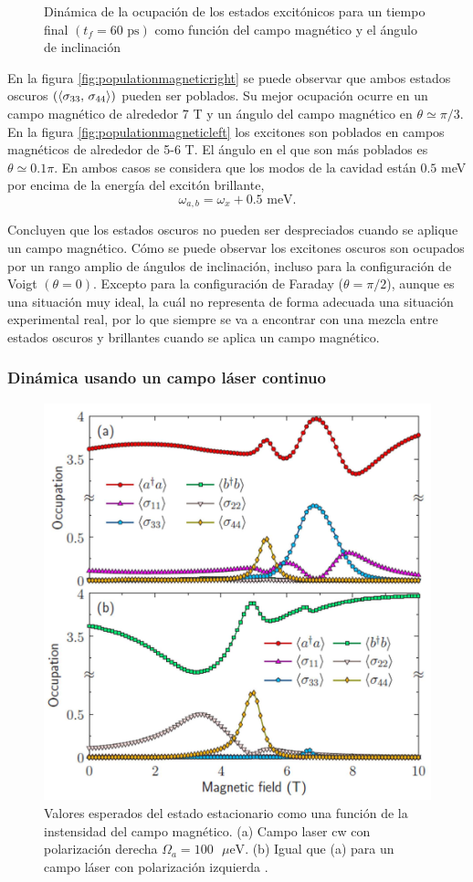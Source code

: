 \documentclass[../main.tex]{subfiles}
\begin{document}
\begin{figure}
	\caption{Dinámica de la ocupación de los estados excitónicos para un tiempo final $(t_f=60\text{ ps})$ como función del campo magnético y el ángulo de inclinación \parencite{Jimenez2017}}
	\label{fig:populationMagnetic}
\end{figure}

En la figura \ref{fig:populationmagneticright} se puede observar que ambos estados oscuros $(\braket{\sigma_{33},\, \sigma_{44}})$ pueden ser poblados. Su mejor ocupación ocurre en un campo magnético de alrededor 7 T y un ángulo del campo magnético en $\theta \simeq \pi/3$. En la figura \ref{fig:populationmagneticleft} los excitones son poblados en campos magnéticos de alrededor de 5-6 T. El ángulo en el que son más poblados es $\theta \simeq 0.1\pi$. En ambos casos se considera que los modos de la cavidad están $0.5$ meV por encima de la energía del excitón brillante,
\begin{equation}
	\omega_{a,b} = \omega_x + 0.5\text{ meV}.
\end{equation}

Concluyen que los estados oscuros no pueden ser despreciados cuando se aplique un campo magnético. Cómo se puede observar los excitones oscuros son ocupados por un rango amplio de ángulos de inclinación, incluso para la configuración de Voigt $(\theta=0)$. Excepto para la configuración de Faraday ($\theta=\pi/2$), aunque es una situación muy ideal, la cuál no representa de forma adecuada una situación experimental real, por lo que siempre se va a encontrar con una mezcla entre estados oscuros y brillantes cuando se aplica un campo magnético.

\subsubsection{Dinámica usando un campo láser continuo}

\begin{figure}[th]
	\centering
	\includegraphics[width=0.7\linewidth]{img/PopulationMagnetic-cwLaser}
	\caption{Valores esperados del estado estacionario como una función de la instensidad del campo magnético. (a) Campo laser cw con polarización derecha $\Omega_a = 100\text{ $\mu$eV}$. (b) Igual que (a) para un campo láser con polarización izquierda \parencite{Jimenez2017}.}
	\label{fig:populationmagnetic-cwlaser}
\end{figure}
\end{document}
